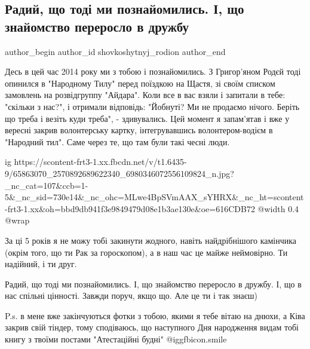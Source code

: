  
 
 
 
 
 
\subsection{Радий, що тоді ми познайомились. І, що знайомство переросло в дружбу}
\label{sec:30_06_2019.fb.shovkoshytnyj_rodion.1.znakomstvo_druzhba}
 
\ifcmt
 author_begin
   author_id shovkoshytnyj_rodion
 author_end
\fi

Десь в цей час 2014 року ми з тобою і познайомились. З Григор'яном Родєй тоді
опинился в "Народному Тилу"  перед поїздкою на Щастя, зі своїм списком
замовлень на розвідгруппу "Айдара". Коли все в вас взяли і запитали в тебе:
"скільки з нас?", і отримали відповідь: "Йобнуті? Ми не продаємо нічого. Беріть
що треба і везіть куди треба", - здивувались. Цей момент я запам'ятав і вже у
вересні закрив волонтерську картку, інтегрувавшись волонтером-водієм в
"Народний тил". Саме через те, що там були такі чесні люди. 

\ifcmt
  ig https://scontent-frt3-1.xx.fbcdn.net/v/t1.6435-9/65863070_2570892689622340_6980346072556109824_n.jpg?_nc_cat=107&ccb=1-5&_nc_sid=730e14&_nc_ohc=MLwe4BpSVmAAX_sYHRX&_nc_ht=scontent-frt3-1.xx&oh=bbd9db941f3e9849479d08e1b3ae130e&oe=616CDB72
  @width 0.4
  @wrap 
\fi

За ці 5 років я не можу тобі закинути жодного, навіть найдрібнішого камінчика
(окрім того, що ти Рак за гороскопом), а в наш час це майже неймовірно. Ти
надійний, і ти друг.

Радий, що тоді ми познайомились. І, що знайомство переросло в дружбу. І, що в
нас спільні цінності. Завжди поруч, якщо що. Але це ти і так знаєш)

P.s. в мене вже закінчуються фотки з тобою, якими я тебе вітаю на днюхи, а Ківа
закрив свій тіндер, тому сподіваюсь, що наступного Дня народження видам тобі
книгу з твоїми постами "Атестаційні будні"  @igg{fbicon.smile} 

